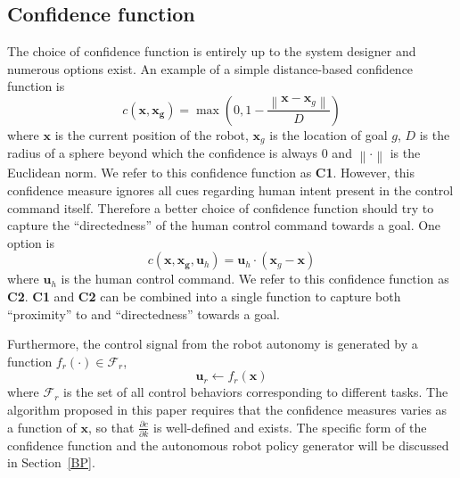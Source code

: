 \documentclass[conference]{IEEEtran}
\newcommand{\norm}[1]{\left\lVert#1\right\rVert}
\begin{document}
\subsection{Confidence function}\label{CF}
The choice of confidence function is entirely up to the system designer and numerous options exist. An example of a simple distance-based confidence function is
\begin{equation*}\label{EQ1}
c(\boldsymbol{x}, \boldsymbol{x_g}) = \max(0, 1 - \frac{\norm{\boldsymbol{x} - \boldsymbol{x}_{g}}}{D})
\end{equation*}
where $\boldsymbol{x}$ is the current position of the robot, $\boldsymbol{x}_{g}$ is the location of goal $g$, $D$ is the radius of a sphere beyond which the confidence is always $0$ and $\norm{\cdot}$ is the Euclidean norm. We refer to this confidence function as \textbf{C1}. However, this confidence measure ignores all cues regarding human intent present in the control command itself. Therefore a better choice of confidence function should try to capture the ``directedness'' of the human control command towards a goal. One option is
\begin{equation*}\label{EQ2}
c({\boldsymbol{x},\boldsymbol{x_g}, \boldsymbol{u}_{h}}) = \boldsymbol{u}_h\cdot(\boldsymbol{x}_{g} - \boldsymbol{x})
\end{equation*}
where $\boldsymbol{u}_h$ is the human control command. We refer to this confidence function as \textbf{C2}. \textbf{C1} and \textbf{C2} can be combined into a single function to capture both ``proximity'' to and ``directedness'' towards a goal.

Furthermore, the control signal from the robot autonomy is generated by a function $f_{r}(\cdot) \in \mathcal{F}_{r}$, 
\begin{equation*}
\boldsymbol{u}_r \leftarrow f_{r}(\boldsymbol{x})
\end{equation*}
where $\mathcal{F}_{r}$ is the set of all control behaviors corresponding to different tasks. The algorithm proposed in this paper requires that the confidence measures varies as a function of $\boldsymbol{x}$, so that $\frac{\partial c}{\partial k}$ is well-defined and exists. The specific form of the confidence function and the autonomous robot policy generator will be discussed in Section~\ref{BP}.
\end{document}
